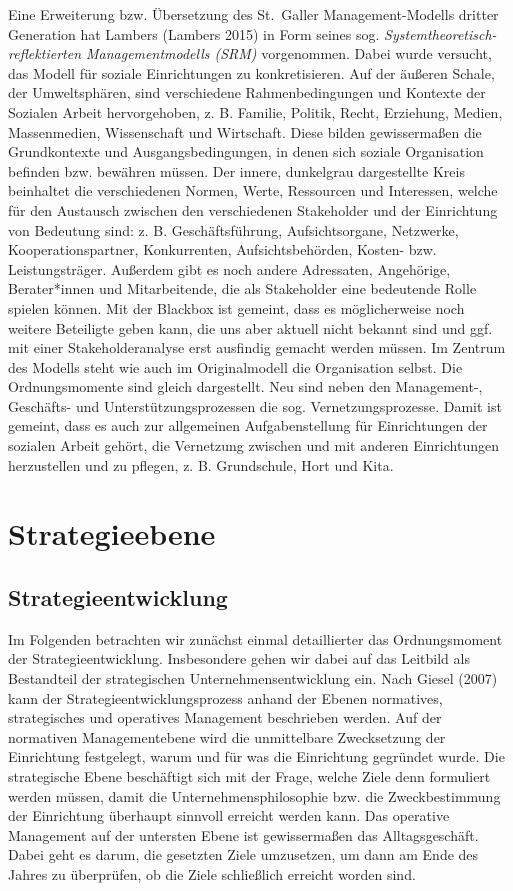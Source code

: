 \documentclass[
  letterpaper,
]{book}
\begin{document}
Eine Erweiterung bzw. Übersetzung des St.~Galler Management-Modells
dritter Generation hat Lambers (Lambers 2015) in Form seines sog.
\emph{Systemtheoretisch-reflektierten Managementmodells (SRM)}
vorgenommen. Dabei wurde versucht, das Modell für soziale Einrichtungen
zu konkretisieren. Auf der äußeren Schale, der Umweltsphären, sind
verschiedene Rahmenbedingungen und Kontexte der Sozialen Arbeit
hervorgehoben, z. B. Familie, Politik, Recht, Erziehung, Medien,
Massenmedien, Wissenschaft und Wirtschaft. Diese bilden gewissermaßen
die Grundkontexte und Ausgangsbedingungen, in denen sich soziale
Organisation befinden bzw. bewähren müssen. Der innere, dunkelgrau
dargestellte Kreis beinhaltet die verschiedenen Normen, Werte,
Ressourcen und Interessen, welche für den Austausch zwischen den
verschiedenen Stakeholder und der Einrichtung von Bedeutung sind: z. B.
Geschäftsführung, Aufsichtsorgane, Netzwerke, Kooperationspartner,
Konkurrenten, Aufsichtsbehörden, Kosten- bzw. Leistungsträger. Außerdem
gibt es noch andere Adressaten, Angehörige, Berater*innen und
Mitarbeitende, die als Stakeholder eine bedeutende Rolle spielen können.
Mit der Blackbox ist gemeint, dass es möglicherweise noch weitere
Beteiligte geben kann, die uns aber aktuell nicht bekannt sind und ggf.
mit einer Stakeholderanalyse erst ausfindig gemacht werden müssen. Im
Zentrum des Modells steht wie auch im Originalmodell die Organisation
selbst. Die Ordnungsmomente sind gleich dargestellt. Neu sind neben den
Management-, Geschäfts- und Unterstützungsprozessen die sog.
Vernetzungsprozesse. Damit ist gemeint, dass es auch zur allgemeinen
Aufgabenstellung für Einrichtungen der sozialen Arbeit gehört, die
Vernetzung zwischen und mit anderen Einrichtungen herzustellen und zu
pflegen, z. B. Grundschule, Hort und Kita.

\chapter{Strategieebene}\label{strategieebene}

\section{Strategieentwicklung}\label{strategieentwicklung}

Im Folgenden betrachten wir zunächst einmal detaillierter das
Ordnungsmoment der Strategieentwicklung. Insbesondere gehen wir dabei
auf das Leitbild als Bestandteil der strategischen
Unternehmensentwicklung ein. Nach Giesel (2007) kann der
Strategieentwicklungsprozess anhand der Ebenen normatives, strategisches
und operatives Management beschrieben werden. Auf der normativen
Managementebene wird die unmittelbare Zwecksetzung der Einrichtung
festgelegt, warum und für was die Einrichtung gegründet wurde. Die
strategische Ebene beschäftigt sich mit der Frage, welche Ziele denn
formuliert werden müssen, damit die Unternehmensphilosophie bzw. die
Zweckbestimmung der Einrichtung überhaupt sinnvoll erreicht werden kann.
Das operative Management auf der untersten Ebene ist gewissermaßen das
Alltagsgeschäft. Dabei geht es darum, die gesetzten Ziele umzusetzen, um
dann am Ende des Jahres zu überprüfen, ob die Ziele schließlich erreicht
worden sind.
\end{document}
